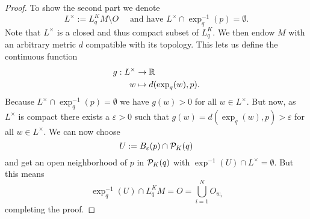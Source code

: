\begin{proof}
    To show the second part we denote
    \[
        L^\times := L^K_qM \setminus O \quad \text{ and have } L^\times \cap \exp^{-1}_q(p) = \emptyset.
    \]
    Note that $L^\times$ is a closed and thus compact subset of $L^K_q$. We then endow $M$ with an arbitrary metric $d$ compatible with its topology. 
    This lets us define the continuous function 
    \begin{align*}
        g:L^\times &\to \mathbb{R}\\
        w &\mapsto d(\exp_q(w),p).
    \end{align*}
    Because $L^\times \cap \exp^{-1}_q(p) = \emptyset$ we have $g(w)>0$ for all $w\in L^\times$. But now, as $L^\times$ is compact there exists a $\varepsilon>0$ such that $g(w)=d(\exp_q(w),p)>\varepsilon$ for all $w\in L^\times$. We can now choose
    \[
        U := B_\varepsilon(p) \cap {\mathcal{P}}_K(q)
    \] and get an open neighborhood of $p$ in ${\mathcal{P}}_K(q)$ with $\exp^{-1}(U)\cap L^\times = \emptyset$. But this means 
    \[
        \exp^{-1}_q(U) \cap L^K_qM = O = \bigcup_{i=1}^N O_{w_i}
    \]
    completing the proof.
\end{proof}


